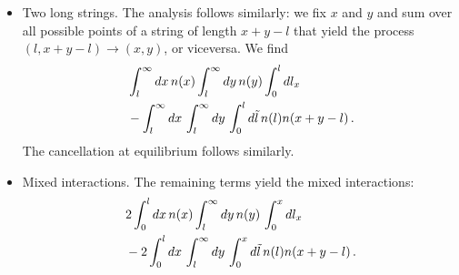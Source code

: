 \documentclass[a4paper,11pt]{article}
\begin{document}
\begin{itemize}
    \item Two long strings.
    The analysis follows similarly: we fix $x$ and $y$ and sum over all possible points of a string of length $x+y-l$ that yield the process $(l,x+y-l)\rightarrow (x,y)$, or viceversa.
    We find
    \begin{equation}
    \begin{split}
       & \int_l^{\infty}{dx\, n(x)\int_l^{\infty}{dy\, n(y) \int_0^l{dl_x}}} \\
       & -\int_l^{\infty}{dx\, \int_l^{\infty}{dy \, \int_0^l{d\Tilde{l}\, n(l)n(x+y-l)}}}\, .
    \end{split}
    \end{equation}
    The cancellation at equilibrium follows similarly.
    \item Mixed interactions.
    The remaining terms yield the mixed interactions:
    \begin{equation}
    \begin{split}
        & 2\int_0^l{dx\, n(x) \int_l^{\infty}{dy\, n(y) \, \int_0^x{dl_x}}} \\
        & -2\int_0^l{dx\, \int_l^{\infty}{dy\, \int_0^x{d\Tilde{l}\, n(l) n(x+y-l)}}} \, .
        \end{split}
    \end{equation}
\end{itemize}
\end{document}
